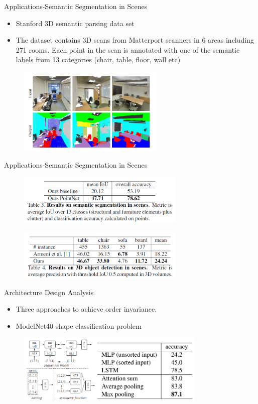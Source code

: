 \documentclass[serif,mathserif]{beamer}
\begin{document}
\begin{frame}{Applications-Semantic Segmentation in Scenes }
	\begin{itemize}
		\item Stanford 3D semantic parsing data set
		\item The dataset contains 3D scans from Matterport scanners in 6 areas including 271 rooms. Each point in the scan is annotated with one of the semantic labels from 13 categories (chair, table, floor, wall etc)
	\end{itemize}
	\begin{figure}
		\includegraphics[width=7cm]{image/sematic.png}
	\end{figure}
\end{frame}

\begin{frame}{Applications-Semantic Segmentation in Scenes}
	\begin{figure}
		\includegraphics[width=8cm]{image/scencs1.png}
	\end{figure}
	\begin{figure}
		\includegraphics[width=8cm]{image/scencs2.png}
	\end{figure}
\end{frame}

\begin{frame}{Architecture Design Analysis}
	\begin{itemize}
		\item Three approaches to achieve order invariance.
		\item ModelNet40 shape classification problem
	\end{itemize}
	\begin{figure}
		\includegraphics[width=9cm]{image/arch.png}
	\end{figure}
\end{frame}
\end{document}
